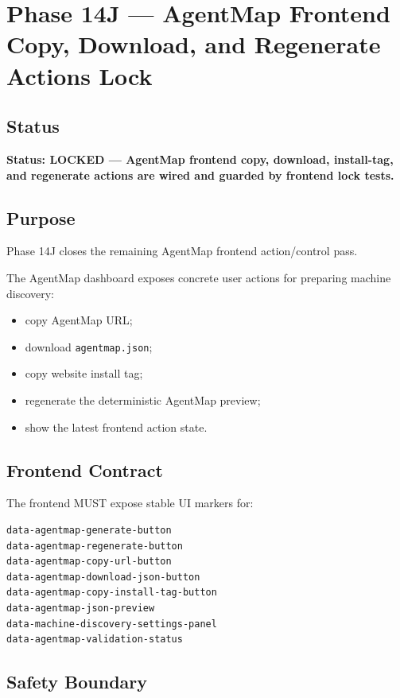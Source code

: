 \section{Phase 14J --- AgentMap Frontend Copy, Download, and Regenerate Actions Lock}
\label{sec:phase14j-agentmap-frontend-actions-lock}

\subsection{Status}

\textbf{Status: LOCKED --- AgentMap frontend copy, download, install-tag, and regenerate actions are wired and guarded by frontend lock tests.}

\subsection{Purpose}

Phase 14J closes the remaining AgentMap frontend action/control pass.

The AgentMap dashboard exposes concrete user actions for preparing machine discovery:

\begin{itemize}
  \item copy AgentMap URL;
  \item download \texttt{agentmap.json};
  \item copy website install tag;
  \item regenerate the deterministic AgentMap preview;
  \item show the latest frontend action state.
\end{itemize}

\subsection{Frontend Contract}

The frontend MUST expose stable UI markers for:

\begin{verbatim}
data-agentmap-generate-button
data-agentmap-regenerate-button
data-agentmap-copy-url-button
data-agentmap-download-json-button
data-agentmap-copy-install-tag-button
data-agentmap-json-preview
data-machine-discovery-settings-panel
data-agentmap-validation-status
\end{verbatim}

\subsection{Safety Boundary}

